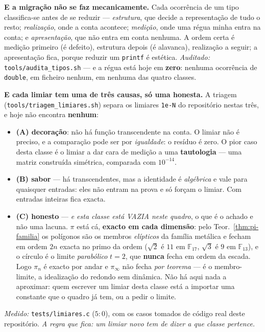 \documentclass[11pt,a4paper]{article}
\newcommand{\code}[1]{\texttt{\small #1}}
\begin{document}
\textbf{E a migração não se faz mecanicamente.} Cada ocorrência de um
tipo classifica-se antes de se reduzir --- \emph{estrutura}, que decide a
representação de tudo o resto; \emph{realização}, onde a conta acontece;
\emph{medição}, onde uma régua minha entra na conta; e
\emph{apresentação}, que não entra em conta nenhuma. A ordem certa é
medição primeiro (é defeito), estrutura depois (é alavanca), realização a
seguir; a apresentação fica, porque reduzir um \code{printf} é estética.
\emph{Auditado:} \code{tools/audita\_tipos.sh} --- e a régua está hoje em
\textbf{zero}: nenhuma ocorrência de \code{double}, em ficheiro nenhum, em
nenhuma das quatro classes.

\textbf{E cada limiar tem uma de três causas, só uma honesta.} A triagem
(\code{tools/triagem\_limiares.sh}) separa os limiares \code{1e-N} do
repositório nestas três, e hoje não encontra \textbf{nenhum}:
\begin{itemize}
\item \textbf{(A) decoração}: não há função transcendente na
conta. O limiar não é preciso, e a comparação pode ser por
\emph{igualdade}: o resíduo é zero. O pior caso desta classe é o limiar
a dar cara de medição a uma \textbf{tautologia} --- uma matriz
construída simétrica, comparada com $10^{-14}$.
\item \textbf{(B) sabor} --- há transcendentes, mas a identidade é
\emph{algébrica} e vale para quaisquer entradas: eles não entram na prova
e só forçam o limiar. Com entradas inteiras fica exacta.
\item \textbf{(C) honesto} --- \emph{e esta classe está VAZIA neste quadro},
o que é o achado e não uma lacuna. $\pi$ está cá, \textbf{exacto em cada
dimensão}: pelo Teor.~\ref{thm:pi-familia} os polígonos são os membros
\emph{elípticos} da família metálica e fecham em ordem $2n$ exacta no
primo da ordem ($\sqrt2$ é $11$ em $\mathbb{F}_{17}$, $\sqrt3$ é $9$ em
$\mathbb{F}_{13}$), e o círculo é o limite \emph{parabólico} $t=2$, que
\textbf{nunca} fecha em ordem da escada. Logo $\pi_n$ é exacto por andar e
$\pi_\infty$ não fecha \emph{por teorema} --- é o membro-limite, a
idealização do redondo sem dinâmica. Não há aqui nada a aproximar: quem
escrever um limiar desta classe está a importar uma constante que o
quadro já tem, ou a pedir o limite.
\end{itemize}
\emph{Medido:} \code{tests/limiares.c} ($5{:}0$), com os casos tomados de
código real deste repositório. \emph{A regra que fica: um limiar novo tem
de dizer a que classe pertence.}
\end{document}
